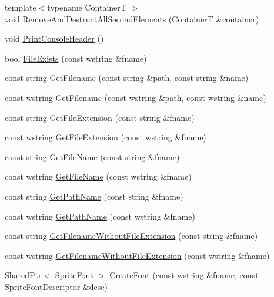 \begin{DoxyCompactItemize}
\item 
{\footnotesize template$<$typename ContainerT $>$ }\\void \hyperlink{namespacemage_aa3db059e4b0563e46cdf3a3a369c3288}{Remove\+And\+Destruct\+All\+Second\+Elements} (ContainerT \&container)
\item 
void \hyperlink{namespacemage_a064756443bd8a1af6974f22c81d29ed0}{Print\+Console\+Header} ()
\item 
bool \hyperlink{namespacemage_ad5867522908e00fb1b0de3ef8dbe4cff}{File\+Exists} (const wstring \&fname)
\item 
const string \hyperlink{namespacemage_aa85467b1af6c9f14e93178cbfd6ca022}{Get\+Filename} (const string \&path, const string \&name)
\item 
const wstring \hyperlink{namespacemage_a42580a2b02794193143aea32e3c815b5}{Get\+Filename} (const wstring \&path, const wstring \&name)
\item 
const string \hyperlink{namespacemage_a4da638506a9dda4f16c41a1a00c0d0e1}{Get\+File\+Extension} (const string \&fname)
\item 
const wstring \hyperlink{namespacemage_a2818c96634f4c8d49dcc4144395b24ef}{Get\+File\+Extension} (const wstring \&fname)
\item 
const string \hyperlink{namespacemage_a167010e334287f9369b15564802a770b}{Get\+File\+Name} (const string \&fname)
\item 
const wstring \hyperlink{namespacemage_ac643523ad89ca58419a2cac93912693b}{Get\+File\+Name} (const wstring \&fname)
\item 
const string \hyperlink{namespacemage_ab3642c6ef6cf94a62fb37b40c3c2f57e}{Get\+Path\+Name} (const string \&fname)
\item 
const wstring \hyperlink{namespacemage_ad23faa6d1854d389eb37fbdeefe97361}{Get\+Path\+Name} (const wstring \&fname)
\item 
const string \hyperlink{namespacemage_ab8841cbab507ef81edb00278110553ad}{Get\+Filename\+Without\+File\+Extension} (const string \&fname)
\item 
const wstring \hyperlink{namespacemage_aac01c0fba57d6737fcf32155748e95b0}{Get\+Filename\+Without\+File\+Extension} (const wstring \&fname)
\item 
\hyperlink{namespacemage_a1e01ae66713838a7a67d30e44c67703e}{Shared\+Ptr}$<$ \hyperlink{classmage_1_1_sprite_font}{Sprite\+Font} $>$ \hyperlink{namespacemage_ac93dae3a8755fa1e1c9be6c8aa0e07d2}{Create\+Font} (const wstring \&fname, const \hyperlink{structmage_1_1_sprite_font_descriptor}{Sprite\+Font\+Descriptor} \&desc)

\end{DoxyCompactItemize}
